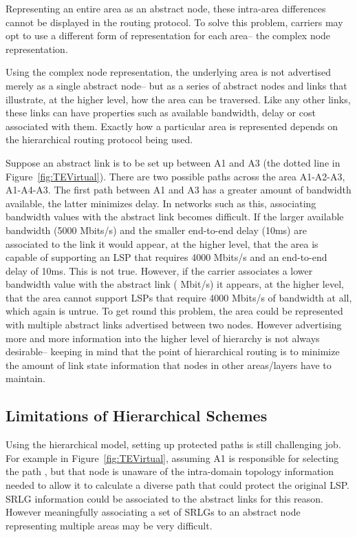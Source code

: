 Representing an entire area as an abstract node, these intra-area differences cannot be displayed in the routing protocol. To solve this problem, carriers may opt to use a different form of representation for each area-- the complex node representation.

Using the complex node representation, the underlying area is not advertised merely as a single abstract node-- but as a series of abstract nodes and links that illustrate, at the higher level, how the area can be traversed. Like any other links, these links can have properties such as available bandwidth, delay or cost associated with them. Exactly how a particular area is represented depends on the hierarchical routing protocol being used.

Suppose an abstract link is to be set up between A1 and A3 (the dotted line in Figure~\ref{fig:TEVirtual}). There are two possible paths across the area A1-A2-A3, A1-A4-A3. The first path between A1 and A3 has a greater amount of bandwidth available, the latter minimizes delay. In networks such as this, associating bandwidth values with the abstract link becomes difficult. If the larger available bandwidth (5000 Mbits/s) and the smaller end-to-end delay (10ms) are associated to the link it would appear, at the higher level, that the area is capable of supporting an LSP that requires 4000 Mbits/s and an end-to-end delay of 10ms. This is not true. However, if the carrier associates a lower bandwidth value with the abstract link ( Mbit/s) it appears, at the higher level, that the area cannot support LSPs that require 4000 Mbits/s of bandwidth at all, which again is untrue. To get round this problem, the area could be represented with multiple abstract links advertised between two nodes. However advertising more and more information into the higher level of hierarchy is not always desirable-- keeping in mind that the point of hierarchical routing is to minimize the amount of link state information that nodes in other areas/layers have to maintain.

\subsection{Limitations of Hierarchical Schemes}
Using the hierarchical model, setting up protected paths is still challenging job. For example in Figure~\ref{fig:TEVirtual}, assuming A1 is responsible for selecting the path , but that node is unaware of the intra-domain topology information needed to allow it to calculate a diverse path that could protect the original LSP. SRLG information could be associated to the abstract links for this reason. However meaningfully associating a set of SRLGs to an abstract node representing multiple areas may be very difficult.

